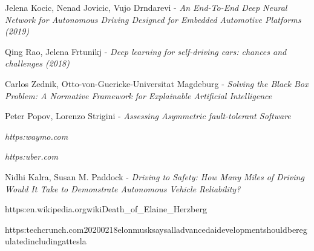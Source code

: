 \begin{thebibliography}{9}
Jelena Kocic, Nenad Jovicic, Vujo Drndarevi - \textit{An End-To-End Deep Neural Network for Autonomous Driving Designed for Embedded Automotive Platforms (2019)}

Qing Rao, Jelena Frtunikj - \textit{Deep learning for self-driving cars: chances and challenges (2018)}

Carlos Zednik, Otto-von-Guericke-Universitat Magdeburg - \textit{Solving the Black Box Problem: A Normative Framework for Explainable Artificial Intelligence}

Peter Popov, Lorenzo Strigini - \textit{Assessing Asymmetric fault-tolerant Software}

\textit{https:\/\/waymo.com\/}

\textit{https:\/\/uber.com\/}

Nidhi Kalra, Susan M. Paddock - \textit{Driving to Safety: How Many Miles of Driving Would It Take to Demonstrate Autonomous Vehicle Reliability?}

https:\/\/en.wikipedia.org\/wiki\/Death\_of\_Elaine\_Herzberg

https:\/\/techcrunch.com\/2020\/02\/18\/elon\-musk\-says\-all\-advanced\-ai\-development\-should\-be\-regulated\-including\-at\-tesla

\end{thebibliography}